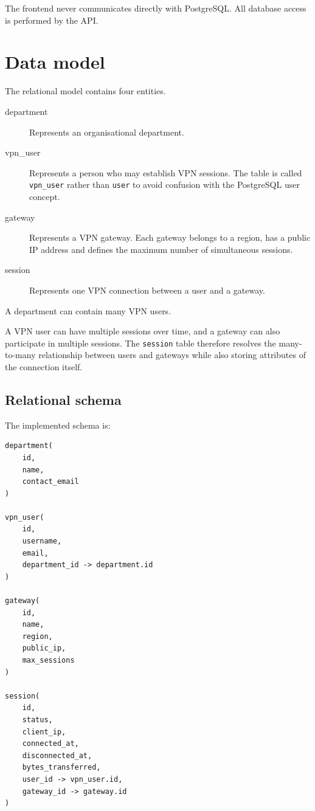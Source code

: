 \documentclass[11pt,a4paper]{article}
\begin{document}
The frontend never communicates directly with PostgreSQL. All database access
is performed by the API.

\section{Data model}

The relational model contains four entities.

\begin{description}

    \item[department]
    Represents an organisational department.

    \item[vpn\_user]
    Represents a person who may establish VPN sessions. The table is called
    \texttt{vpn\_user} rather than \texttt{user} to avoid confusion with the
    PostgreSQL user concept.

    \item[gateway]
    Represents a VPN gateway. Each gateway belongs to a region, has a public IP
    address and defines the maximum number of simultaneous sessions.

    \item[session]
    Represents one VPN connection between a user and a gateway.

\end{description}

A department can contain many VPN users.

A VPN user can have multiple sessions over time, and a gateway can also
participate in multiple sessions. The \texttt{session} table therefore
resolves the many-to-many relationship between users and gateways while also
storing attributes of the connection itself.

\subsection{Relational schema}

The implemented schema is:

\begin{verbatim}
department(
    id,
    name,
    contact_email
)

vpn_user(
    id,
    username,
    email,
    department_id -> department.id
)

gateway(
    id,
    name,
    region,
    public_ip,
    max_sessions
)

session(
    id,
    status,
    client_ip,
    connected_at,
    disconnected_at,
    bytes_transferred,
    user_id -> vpn_user.id,
    gateway_id -> gateway.id
)
\end{verbatim}
\end{document}
